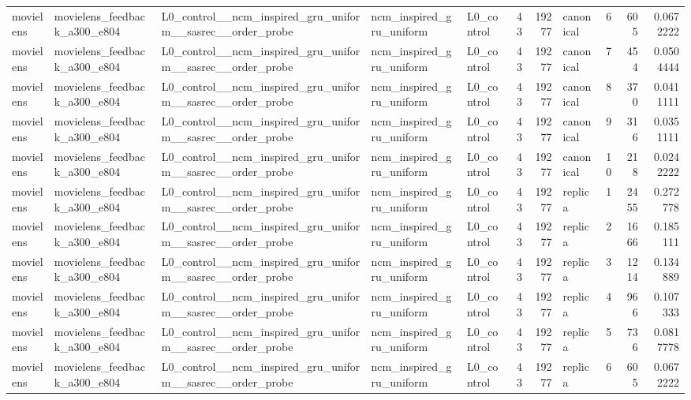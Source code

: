 \begin{table}[htbp!]
\begin{tabular}{lllllrrlrrr}
movielens & movielens\_feedback\_a300\_e804 & L0\_control\_\_ncm\_inspired\_gru\_uniform\_\_sasrec\_\_order\_probe & ncm\_inspired\_gru\_uniform & L0\_control & 43 & 19277 & canonical & 6 & 605 & 0.0672222 \\
movielens & movielens\_feedback\_a300\_e804 & L0\_control\_\_ncm\_inspired\_gru\_uniform\_\_sasrec\_\_order\_probe & ncm\_inspired\_gru\_uniform & L0\_control & 43 & 19277 & canonical & 7 & 454 & 0.0504444 \\
movielens & movielens\_feedback\_a300\_e804 & L0\_control\_\_ncm\_inspired\_gru\_uniform\_\_sasrec\_\_order\_probe & ncm\_inspired\_gru\_uniform & L0\_control & 43 & 19277 & canonical & 8 & 370 & 0.0411111 \\
movielens & movielens\_feedback\_a300\_e804 & L0\_control\_\_ncm\_inspired\_gru\_uniform\_\_sasrec\_\_order\_probe & ncm\_inspired\_gru\_uniform & L0\_control & 43 & 19277 & canonical & 9 & 316 & 0.0351111 \\
movielens & movielens\_feedback\_a300\_e804 & L0\_control\_\_ncm\_inspired\_gru\_uniform\_\_sasrec\_\_order\_probe & ncm\_inspired\_gru\_uniform & L0\_control & 43 & 19277 & canonical & 10 & 218 & 0.0242222 \\
movielens & movielens\_feedback\_a300\_e804 & L0\_control\_\_ncm\_inspired\_gru\_uniform\_\_sasrec\_\_order\_probe & ncm\_inspired\_gru\_uniform & L0\_control & 43 & 19277 & replica & 1 & 2455 & 0.272778 \\
movielens & movielens\_feedback\_a300\_e804 & L0\_control\_\_ncm\_inspired\_gru\_uniform\_\_sasrec\_\_order\_probe & ncm\_inspired\_gru\_uniform & L0\_control & 43 & 19277 & replica & 2 & 1666 & 0.185111 \\
movielens & movielens\_feedback\_a300\_e804 & L0\_control\_\_ncm\_inspired\_gru\_uniform\_\_sasrec\_\_order\_probe & ncm\_inspired\_gru\_uniform & L0\_control & 43 & 19277 & replica & 3 & 1214 & 0.134889 \\
movielens & movielens\_feedback\_a300\_e804 & L0\_control\_\_ncm\_inspired\_gru\_uniform\_\_sasrec\_\_order\_probe & ncm\_inspired\_gru\_uniform & L0\_control & 43 & 19277 & replica & 4 & 966 & 0.107333 \\
movielens & movielens\_feedback\_a300\_e804 & L0\_control\_\_ncm\_inspired\_gru\_uniform\_\_sasrec\_\_order\_probe & ncm\_inspired\_gru\_uniform & L0\_control & 43 & 19277 & replica & 5 & 736 & 0.0817778 \\
movielens & movielens\_feedback\_a300\_e804 & L0\_control\_\_ncm\_inspired\_gru\_uniform\_\_sasrec\_\_order\_probe & ncm\_inspired\_gru\_uniform & L0\_control & 43 & 19277 & replica & 6 & 605 & 0.0672222 \\

\end{tabular}
\end{table}
